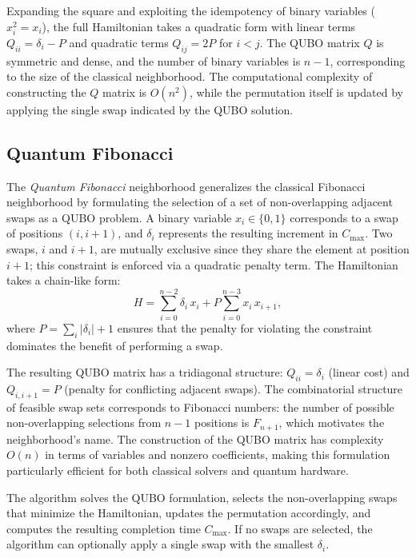\documentclass[10pt,twoside,twocolumn,a4paper]{article}
\begin{document}
Expanding the square and exploiting the idempotency of binary variables ($x_i^2 = x_i$), the full Hamiltonian takes a quadratic form with linear terms $Q_{ii} = \delta_i - P$ and quadratic terms $Q_{ij} = 2P$ for $i < j$. The QUBO matrix $Q$ is symmetric and dense, and the number of binary variables is $n-1$, corresponding to the size of the classical neighborhood. The computational complexity of constructing the $Q$ matrix is $O(n^2)$, while the permutation itself is updated by applying the single swap indicated by the QUBO solution.


\subsection{Quantum Fibonacci}
The \emph{Quantum Fibonacci} neighborhood generalizes the classical Fibonacci neighborhood by formulating the selection of a set of non-overlapping adjacent swaps as a QUBO problem. A binary variable $x_i \in \{0,1\}$ corresponds to a swap of positions $(i, i+1)$, and $\delta_i$ represents the resulting increment in $C_{\max}$. Two swaps, $i$ and $i+1$, are mutually exclusive since they share the element at position $i+1$; this constraint is enforced via a quadratic penalty term. The Hamiltonian takes a chain-like form:
\begin{equation}
    H = \sum_{i=0}^{n-2} \delta_i\, x_i
        + P \sum_{i=0}^{n-3} x_i\, x_{i+1},
    \label{eq:qubo_fib}
\end{equation}
where $P = \sum_i |\delta_i| + 1$ ensures that the penalty for violating the constraint dominates the benefit of performing a swap.

The resulting QUBO matrix has a tridiagonal structure: $Q_{ii} = \delta_i$ (linear cost) and $Q_{i,i+1} = P$ (penalty for conflicting adjacent swaps). The combinatorial structure of feasible swap sets corresponds to Fibonacci numbers: the number of possible non-overlapping selections from $n-1$ positions is $F_{n+1}$, which motivates the neighborhood's name. The construction of the QUBO matrix has complexity $O(n)$ in terms of variables and nonzero coefficients, making this formulation particularly efficient for both classical solvers and quantum hardware.

The algorithm solves the QUBO formulation, selects the non-overlapping swaps that minimize the Hamiltonian, updates the permutation accordingly, and computes the resulting completion time $C_{\max}$. If no swaps are selected, the algorithm can optionally apply a single swap with the smallest $\delta_i$.
\end{document}
